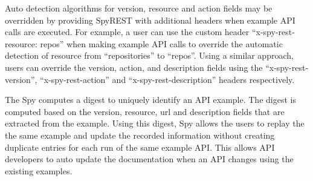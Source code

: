 \documentclass[conference]{IEEEtran}
\begin{document}
Auto detection algorithms for version, resource and action fields may be overridden by providing SpyREST with additional headers when example API calls are executed. For example, a user can use the custom header ``x-spy-rest-resource: repos'' when making example API calls to override the automatic detection of resource from ``repositories'' to ``repos''. Using a similar approach, users can override the version, action, and description fields using the ``x-spy-rest-version'', ``x-spy-rest-action'' and ``x-spy-rest-description'' headers respectively.

The Spy computes a digest to uniquely identify an API example. The digest is computed based on the version, resource, url and description fields that are extracted from the example. Using this digest, Spy allows the users to replay the the same example and update the recorded information without creating duplicate entries for each run of the same example API. This allows API developers to auto update the documentation when an API changes using the existing examples.
\end{document}
